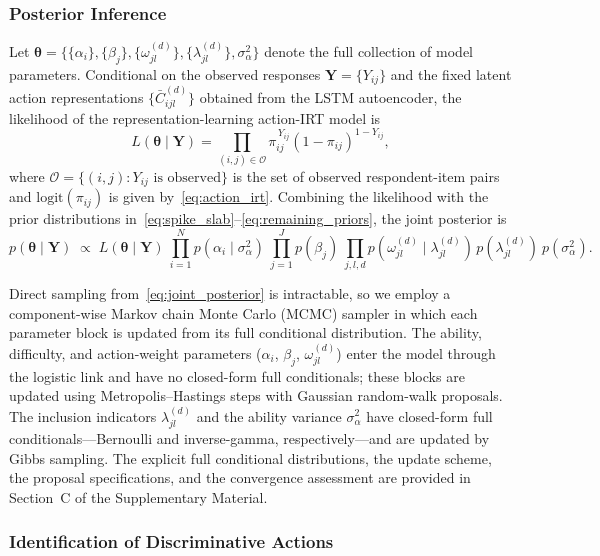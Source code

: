 \documentclass[A4paper,11pt]{article}
\begin{document}
\subsubsection{Posterior Inference}

Let $\boldsymbol{\theta}=\{\{\alpha_i\},\{\beta_j\},\{\omega_{jl}^{(d)}\},
\{\lambda_{jl}^{(d)}\},\sigma_{\alpha}^{2}\}$ denote the full collection of model
parameters. Conditional on the observed responses $\mathbf{Y}=\{Y_{ij}\}$ and the
fixed latent action representations $\{\bar{C}_{ijl}^{(d)}\}$ obtained from the LSTM
autoencoder, the likelihood of the representation-learning action-IRT model is
\begin{equation}\label{eq:likelihood}
L(\boldsymbol{\theta}\mid\mathbf{Y})
=
\prod_{(i,j)\in\mathcal{O}}
\pi_{ij}^{\,Y_{ij}}
(1-\pi_{ij})^{1-Y_{ij}},
\end{equation}
where $\mathcal{O}=\{(i,j):Y_{ij}\text{ is observed}\}$ is the set of observed
respondent-item pairs and $\mathrm{logit}(\pi_{ij})$ is given by~\eqref{eq:action_irt}.
Combining the likelihood with the prior distributions
in~\eqref{eq:spike_slab}--\eqref{eq:remaining_priors}, the joint posterior is
\begin{equation}\label{eq:joint_posterior}
p(\boldsymbol{\theta}\mid\mathbf{Y})
\;\propto\;
L(\boldsymbol{\theta}\mid\mathbf{Y})
\
\prod_{i=1}^{N}p(\alpha_i\mid\sigma_{\alpha}^{2})
\
\prod_{j=1}^{J}p(\beta_j)
\
\prod_{j,l,d}
p(\omega_{jl}^{(d)}\mid\lambda_{jl}^{(d)})
\,p(\lambda_{jl}^{(d)})
\
p(\sigma_{\alpha}^{2}).
\end{equation}

Direct sampling from~\eqref{eq:joint_posterior} is intractable, so we employ a
component-wise Markov chain Monte Carlo (MCMC) sampler in which each parameter block is
updated from its full conditional distribution. The ability, difficulty, and
action-weight parameters ($\alpha_i$, $\beta_j$, $\omega_{jl}^{(d)}$) enter the model
through the logistic link and have no closed-form full conditionals; these blocks are
updated using Metropolis--Hastings steps with Gaussian random-walk proposals. The
inclusion indicators $\lambda_{jl}^{(d)}$ and the ability variance $\sigma_{\alpha}^{2}$
have closed-form full conditionals---Bernoulli and inverse-gamma, respectively---and are
updated by Gibbs sampling. The explicit full conditional distributions, the update
scheme, the proposal specifications, and the convergence assessment are provided in
Section~C of the Supplementary Material.

\subsubsection{Identification of Discriminative Actions}
\end{document}
